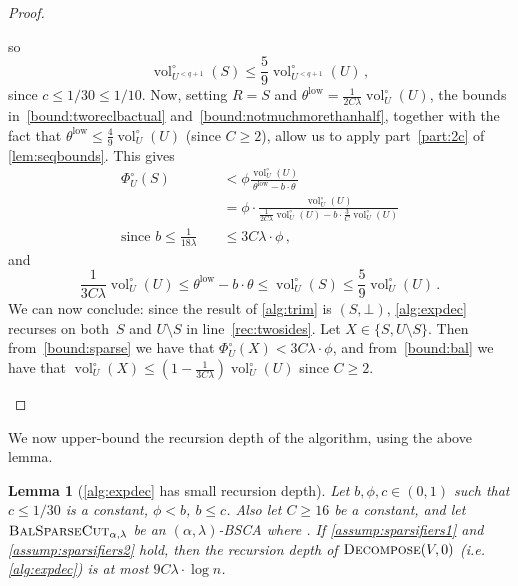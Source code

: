 \documentclass[epsfig,letter,11pt]{article}
\numberwithin{equation}{section}
\newcommand{\unvolc}[2]{\operatorname{vol}_{#2}^\circ (#1)}
\newcommand{\unspc}[2]{\Phi_{#2}^\circ (#1)}
\newcommand{\bsc}{\textsc{BalSparseCut}_{\alpha,\lambda}}
\newcommand{\ed}{\textsc{Decompose}}
\DeclareMathOperator*{\low}{low}
\newtheorem{lemma}[theorem]{Lemma}
\begin{document}
\begin{proof}
\begin{itemize}
\begin{equation*}
		\end{equation*}
		so
		\begin{equation}
			\label{bound:notmuchmorethanhalf}
			\unvolc{S}{U^{<q+1}} \le \frac{5}{9}\unvolc{U}{U^{<q+1}} \, ,
		\end{equation}
	since $c \le 1/30 \le  1/10$. Now, setting $R=S$ and $\theta^{\low}=\frac{1}{2C\lambda} \unvolc{U}{U}$, the bounds in~\eqref{bound:tworeclbactual} and~\eqref{bound:notmuchmorethanhalf}, together with the fact that $\theta^{\low}  \le \frac{4}{9}\unvolc{U}{U}$ (since $C \ge 2$), allow us to apply part~\eqref{part:2c} of \cref{lem:seqbounds}. This gives
	\begin{align}
		\unspc{S}{U} & < \phi \frac{\unvolc{U}{U}}{\theta^{\low}-b\cdot \theta} \\
		& = \phi \cdot \frac{\unvolc{U}{U}}{\frac{1}{2C\lambda}\unvolc{U}{U}- b \cdot \frac{3}{C}\unvolc{U}{U}} \\
		\text{since $b \le \frac{1}{18 \lambda}$}\quad & \le 3C\lambda \cdot \phi \label{bound:sparse} \, , 
	\end{align}
	and
	\begin{equation}
		\frac{1}{3C\lambda}\unvolc{U}{U} \le \theta^{\low}-b\cdot \theta \le \unvolc{S}{U} \le \frac{5}{9} \unvolc{U}{U} \, .  \label{bound:bal}
	\end{equation}
	We can now conclude: since the result of \cref{alg:trim} is $(S,\bot)$, \cref{alg:expdec} recurses on both~$S$ and $U \setminus S$ in line~\eqref{rec:twosides}. Let $X \in \{S,U\setminus S\}$. Then from~\eqref{bound:sparse} we have that $\unspc{X}{U} < 3C\lambda \cdot \phi$, and from~\eqref{bound:bal} we have that $\unvolc{X}{U} \le (1-\frac{1}{3C\lambda}) \unvolc{U}{U}$ since $C \ge 2$.
	
	\end{itemize}
\end{proof}

\noindent
We now upper-bound the recursion depth of the algorithm, using the above lemma.

\begin{lemma}[\cref{alg:expdec} has small recursion depth]
	\label{lem:bounddepth}
	Let $b, \phi,c \in (0,1)$ such that $c \le 1/30$ is a constant, $\phi < b$, $b \le c$. Also let $C \ge 16$ be a constant, and let $\bsc$ be an $(\alpha,\lambda)$-BSCA where . If \cref{assump:sparsifiers1} and \cref{assump:sparsifiers2} hold, then the recursion depth of $\ed(V,0)$ (i.e. \cref{alg:expdec}) is at most $9C\lambda \cdot \log n $.
\end{lemma}
\end{document}
